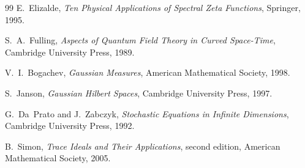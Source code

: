 \documentclass[11pt]{article}
\begin{document}
\begin{thebibliography}{99}
E.~Elizalde,
\emph{Ten Physical Applications of Spectral Zeta Functions},
Springer, 1995.

S.~A.~Fulling,
\emph{Aspects of Quantum Field Theory in Curved Space-Time},
Cambridge University Press, 1989.

V.~I.~Bogachev,
\emph{Gaussian Measures},
American Mathematical Society, 1998.

S.~Janson,
\emph{Gaussian Hilbert Spaces},
Cambridge University Press, 1997.

G.~Da~Prato and J.~Zabczyk,
\emph{Stochastic Equations in Infinite Dimensions},
Cambridge University Press, 1992.

B.~Simon,
\emph{Trace Ideals and Their Applications},
second edition,
American Mathematical Society, 2005.

\end{thebibliography}
\end{document}
